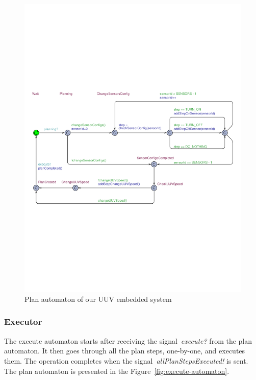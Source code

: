 \begin{figure}[h!]
	\centering
	\includegraphics[trim = 5mm 80mm 0mm 90mm, clip, width=\linewidth]{figures/Planner.pdf}
	\caption{Plan automaton of our UUV embedded system}\label{fig:plan-automaton}
	
	\vspace*{-2mm}
\end{figure}


\subsubsection{Executor}
The execute automaton starts after receiving the signal~\textit{execute?} from the plan automaton. It then goes through all the plan steps, one-by-one, and executes them. The operation completes when the signal~\textit{allPlanStepsExecuted!} is sent. The plan automaton is presented in the Figure~\ref{fig:execute-automaton}.

